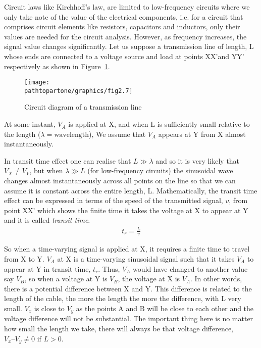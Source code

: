 Circuit laws like Kirchhoff’s law, are limited to low-frequency circuits where we only take note of the value of the electrical components, i.e. for a circuit that comprises circuit elements like resistors, capacitors and inductors, only their values are needed for the circuit analysis. However, as frequency increases, the signal value changes significantly. Let us suppose a transmission line of length, L whose ends are connected to a voltage source and load at points XX'and YY' respectively as shown in Figure~\ref{fig:first}.
\begin{figure}[h]
\centering
\texttt{[image: \\pathtopartone/graphics/fig2.7]}
\caption{Circuit diagram of a transmission line}
\label{fig:first}
\end{figure}

At some instant, $ V_{A} $ is applied at X, and when L is sufficiently small relative to the length ($  \lambda = \text{wavelength} $), We assume that $ V_{A} $ appears at Y from X almost instantaneously.

In transit time effect one can realise that $ L \gg\lambda$ and so it is very likely that $ V_{X} \neq V_{Y} $, but when $  \lambda \gg L  $ (for low-frequency circuits) the sinusoidal wave changes almost instantaneously across all points on the line so that we can assume it is constant across the entire length, L. Mathematically, the transit time effect can be expressed in terms of the speed of the transmitted signal, $v$, from point XX' which shows the finite time it takes the voltage at X to appear at Y and it is called \textit{transit time}.
\begin{align}
t_{r} = \frac{L}{v}
\label{eqn:transittime}
\end{align}

So when a time-varying signal is applied at X, it requires a finite time to travel from X to Y. $ V_{A} $ at X is a time-varying sinusoidal signal such that it takes $ V_{A} $ to appear at Y in transit time, $t_r$. Thus, $ V_{A} $ would have changed to another value say $ V_{B} $, so when a voltage at Y is $ V_{B} $, the voltage at X is $ V_{A} $. In other words, there is a potential difference between X and Y. This difference is related to the length of the cable, the more the length the more the difference, with L very small. $ V_{x} $ is close to $ V_{y} $ as the points A and B will be close to each other and the voltage difference will not be substantial. The important thing here is no matter how small the length we take, there will always be that voltage difference, $ V_{x} – V_{y} \neq 0 $ if $ L > 0 $.

